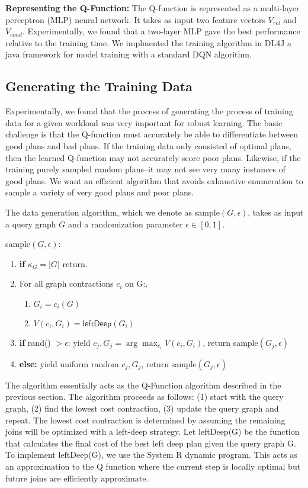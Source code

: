 \vspace{0.5em} \noindent \textbf{Representing the Q-Function: }
The Q-function is represented as a multi-layer perceptron (MLP) neural network.
It takes as input two feature vectors $V_{rel}$ and $V_{cond}$. Experimentally, we found that a two-layer MLP gave the best performance relative to the training time. We implmented the training algorithm in \textsf{DL4J} a java framework for model training with a standard DQN algorithm.

\subsection{Generating the Training Data}
Experimentally, we found that the process of generating the process of training data for a given workload was very important for robust learning.
The basic challenge is that the Q-function must accurately be able to differentiate between good plans and bad plans.
If the training data only consisted of optimal plans, then the learned Q-function may not accurately score poor plans. Likewise, if the training purely sampled random plans--it may not see very many instances of good plans.
We want an efficient algorithm that avoids exhaustive enumeration to sample a variety of very good plans and poor plans.

The data generation algorithm, which we denote as \textsf{sample}$(G, \epsilon)$, takes as input a query graph $G$ and a randomization parameter $\epsilon \in [0,1]$.

\textsf{sample}$(G, \epsilon)$:
\begin{enumerate}
    \item \textbf{if} $\kappa_G = |G|$ return.
    \item For all graph contractions $c_i$ on G:.
    \begin{enumerate}
    \item $G_i = c_i(G)$  
    \item $V(c_i, G_i) = \textsf{leftDeep}(G_i)$
    \end{enumerate}
    \item \textbf{if} \textsf{rand()} $> \epsilon$: yield $c_j, G_j = \arg\max_{c_i} V(c_i,G_i)$, return \textsf{sample}$(G_j,\epsilon)$
    \item \textbf{else: } yield uniform random $c_j, G_j $, return \textsf{sample}$(G_j,\epsilon)$
\end{enumerate}

The algorithm essentially acts as the Q-Function algorithm described in the previous section. The algorithm proceeds as follows: (1) start with the query graph, (2) find the lowest cost contraction, (3) update the query graph and repeat. The lowest cost contraction is determined by assuming the remaining joins will be optimized with a left-deep strategy.
Let \textsf{leftDeep}(G) be the function that calculates the final cost of the best left deep plan given the query graph G.
To implement \textsf{leftDeep}(G), we use the System R dynamic program. 
This acts as an approximation to the Q function where the current step is locally optimal but future joins are efficiently approximate. {}

